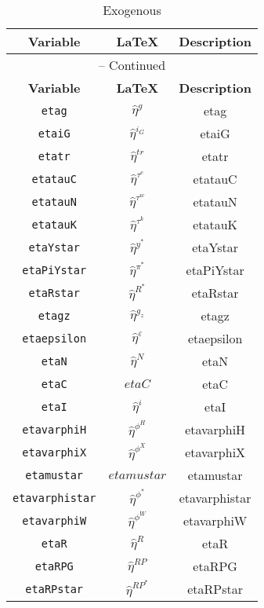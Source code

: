 \begin{center}
\begin{longtable}{ccc}
\caption{Exogenous}\\%
\hline%
\multicolumn{1}{c}{\textbf{Variable}} &
\multicolumn{1}{c}{\textbf{\LaTeX}} &
\multicolumn{1}{c}{\textbf{Description}}\\%
\hline\hline%
\endfirsthead
\multicolumn{3}{c}{{\tablename} \thetable{} -- Continued}\\%
\hline%
\multicolumn{1}{c}{\textbf{Variable}} &
\multicolumn{1}{c}{\textbf{\LaTeX}} &
\multicolumn{1}{c}{\textbf{Description}}\\%
\hline\hline%
\endhead
\texttt{etag} & $\hat{\eta}^{g}$ & etag\\
\texttt{etaiG} & $\hat{\eta}^{i_G}$ & etaiG\\
\texttt{etatr} & $\hat{\eta}^{tr}$ & etatr\\
\texttt{etatauC} & $\hat{\eta}^{\tau^c}$ & etatauC\\
\texttt{etatauN} & $\hat{\eta}^{\tau^w}$ & etatauN\\
\texttt{etatauK} & $\hat{\eta}^{\tau^k}$ & etatauK\\
\texttt{etaYstar} & $\hat{\eta}^{y^*}$ & etaYstar\\
\texttt{etaPiYstar} & $\hat{\eta}^{\pi^*}$ & etaPiYstar\\
\texttt{etaRstar} & $\hat{\eta}^{R^*}$ & etaRstar\\
\texttt{etagz} & $\hat{\eta}^{g_z}$ & etagz\\
\texttt{etaepsilon} & $\hat{\eta}^{\varepsilon}$ & etaepsilon\\
\texttt{etaN} & $\hat{\eta}^{N}$ & etaN\\
\texttt{etaC} & $etaC$ & etaC\\
\texttt{etaI} & $\hat{\eta}^{i}$ & etaI\\
\texttt{etavarphiH} & $\hat{\eta}^{\phi^H}$ & etavarphiH\\
\texttt{etavarphiX} & $\hat{\eta}^{\phi^X}$ & etavarphiX\\
\texttt{etamustar} & $etamustar$ & etamustar\\
\texttt{etavarphistar} & $\hat{\eta}^{\phi^*}$ & etavarphistar\\
\texttt{etavarphiW} & $\hat{\eta}^{\phi^W}$ & etavarphiW\\
\texttt{etaR} & $\hat{\eta}^{R}$ & etaR\\
\texttt{etaRPG} & $\hat{\eta}^{RP}$ & etaRPG\\
\texttt{etaRPstar} & $\hat{\eta}^{RP^*}$ & etaRPstar\\

\end{longtable}
\end{center}
